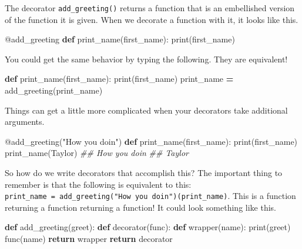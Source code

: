 \documentclass[
  12pt,
  krantz2]{krantz}
\makeatletter
\newenvironment{Shaded}{\begin{snugshade}}{\end{snugshade}}
\newcommand{\AttributeTok}[1]{\textcolor[rgb]{0.61,0.61,0.61}{#1}}
\newcommand{\BuiltInTok}[1]{#1}
\newcommand{\CommentTok}[1]{\textcolor[rgb]{0.37,0.37,0.37}{\textit{#1}}}
\newcommand{\ControlFlowTok}[1]{\textcolor[rgb]{0.27,0.27,0.27}{\textbf{#1}}}
\newcommand{\KeywordTok}[1]{\textcolor[rgb]{0.27,0.27,0.27}{\textbf{#1}}}
\newcommand{\NormalTok}[1]{#1}
\newcommand{\OperatorTok}[1]{\textcolor[rgb]{0.43,0.43,0.43}{\textbf{#1}}}
\newcommand{\StringTok}[1]{\textcolor[rgb]{0.5,0.5,0.5}{#1}}
\newenvironment{kframe}{%
\medskip{}
\setlength{\fboxsep}{.8em}
 \def\at@end@of@kframe{}%
 \ifinner\ifhmode%
  \def\at@end@of@kframe{\end{minipage}}%
  \begin{minipage}{\columnwidth}%
 \fi\fi%
 \def\FrameCommand##1{\hskip\@totalleftmargin \hskip-\fboxsep
 \colorbox{shadecolor}{##1}\hskip-\fboxsep
     \hskip-\linewidth \hskip-\@totalleftmargin \hskip\columnwidth}%
 \MakeFramed {\advance\hsize-\width
   \@totalleftmargin\z@ \linewidth\hsize
   \@setminipage}}%
 {\par\unskip\endMakeFramed%
 \at@end@of@kframe}
\renewenvironment{Shaded}{\begin{kframe}}{\end{kframe}}
\makeatother
\begin{document}
The decorator \texttt{add\_greeting()} returns a function that is an embellished version of the function it is given. When we decorate a function with it, it looks like this.

\begin{Shaded}
\begin{Highlighting}[]
\AttributeTok{@add\_greeting}
\KeywordTok{def}\NormalTok{ print\_name(first\_name):}
  \BuiltInTok{print}\NormalTok{(first\_name)}
\end{Highlighting}
\end{Shaded}

You could get the same behavior by typing the following. They are equivalent!

\begin{Shaded}
\begin{Highlighting}[]
\KeywordTok{def}\NormalTok{ print\_name(first\_name):}
  \BuiltInTok{print}\NormalTok{(first\_name)}
\NormalTok{print\_name }\OperatorTok{=}\NormalTok{ add\_greeting(print\_name)}
\end{Highlighting}
\end{Shaded}

Things can get a little more complicated when your decorators take additional arguments.

\begin{Shaded}
\begin{Highlighting}[]
\AttributeTok{@add\_greeting}\NormalTok{(}\StringTok{"How you doin\textquotesingle{}"}\NormalTok{)}
\KeywordTok{def}\NormalTok{ print\_name(first\_name):}
  \BuiltInTok{print}\NormalTok{(first\_name)}
\NormalTok{print\_name(}\StringTok{\textquotesingle{}Taylor\textquotesingle{}}\NormalTok{)}
\CommentTok{\#\# How you doin\textquotesingle{}}
\CommentTok{\#\# Taylor}
\end{Highlighting}
\end{Shaded}

So how do we write decorators that accomplish this? The important thing to remember is that the following is equivalent to this: \texttt{print\_name\ =\ add\_greeting("How\ you\ doin\textquotesingle{}")(print\_name)}. This is a function returning a function returning a function! It could look something like this.

\begin{Shaded}
\begin{Highlighting}[]
\KeywordTok{def}\NormalTok{ add\_greeting(greet):}
  \KeywordTok{def}\NormalTok{ decorator(func):}
    \KeywordTok{def}\NormalTok{ wrapper(name):}
      \BuiltInTok{print}\NormalTok{(greet)}
\NormalTok{      func(name)}
    \ControlFlowTok{return}\NormalTok{ wrapper}
  \ControlFlowTok{return}\NormalTok{ decorator}
\end{Highlighting}
\end{Shaded}
\end{document}
